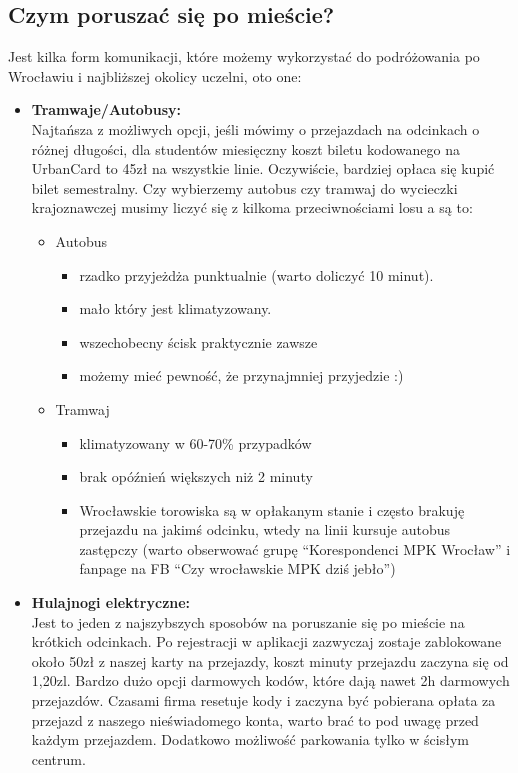 \documentclass[11pt]{article}
\begin{document}
\subsection{Czym poruszać się po mieście?}
\indent \hspace{0.5cm} Jest kilka form komunikacji, które możemy wykorzystać do podróżowania po Wrocławiu i najbliższej okolicy uczelni, oto one:
\begin{itemize}
    \item \textbf{Tramwaje/Autobusy:} \\
    \indent Najtańsza z możliwych opcji, jeśli mówimy o przejazdach na odcinkach o różnej długości, dla studentów miesięczny koszt biletu kodowanego na UrbanCard to 45zł na wszystkie linie. Oczywiście, bardziej opłaca się kupić bilet semestralny. Czy wybierzemy autobus czy tramwaj do wycieczki krajoznawczej musimy liczyć się z kilkoma przeciwnościami losu a są to:
    \begin{itemize}
        \item Autobus
        \begin{itemize}
            \item rzadko przyjeżdża punktualnie (warto doliczyć 10 minut).
            \item mało który jest klimatyzowany.
            \item wszechobecny ścisk praktycznie zawsze
            \item możemy mieć pewność, że przynajmniej przyjedzie :)
        \end{itemize}
        \item Tramwaj
        \begin{itemize}
            \item klimatyzowany w 60-70\% przypadków
            \item brak opóźnień większych niż 2 minuty
            \item Wrocławskie torowiska są w opłakanym stanie i często brakuję przejazdu na jakimś odcinku, wtedy na linii kursuje autobus zastępczy (warto obserwować grupę “Korespondenci MPK Wrocław” i fanpage na FB “Czy wrocławskie MPK dziś jebło”)
        \end{itemize}
    \end{itemize}
    \item \textbf{Hulajnogi elektryczne:} \\
    \indent Jest to jeden z najszybszych sposobów na poruszanie się po mieście na krótkich odcinkach. Po rejestracji w aplikacji zazwyczaj zostaje zablokowane około 50zł z naszej karty na przejazdy, koszt minuty przejazdu zaczyna się od 1,20zl. Bardzo dużo opcji darmowych kodów, które dają nawet 2h darmowych przejazdów. Czasami firma resetuje kody i zaczyna być pobierana opłata za przejazd z naszego nieświadomego konta, warto brać to pod uwagę przed każdym przejazdem. Dodatkowo możliwość parkowania tylko w ścisłym centrum.

\end{itemize}
\end{document}
